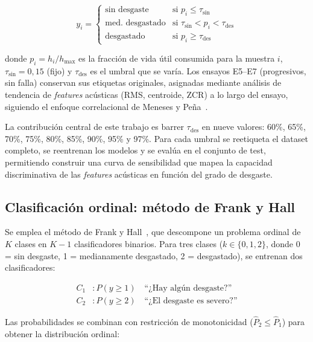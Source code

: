 \documentclass[10pt,twocolumn]{article}
\begin{document}
\begin{equation}
y_i = \begin{cases}
  \text{sin desgaste}        & \text{si } p_i \leq \tau_{\text{sin}} \\
  \text{med.\ desgastado}    & \text{si } \tau_{\text{sin}} < p_i < \tau_{\text{des}} \\
  \text{desgastado}           & \text{si } p_i \geq \tau_{\text{des}}
\end{cases}
\label{eq:etiquetado}
\end{equation}

\noindent donde $p_i = h_i / h_{\max}$ es la fracción de vida útil consumida
para la muestra $i$, $\tau_{\text{sin}} = 0{,}15$ (fijo) y
$\tau_{\text{des}}$ es el umbral que se varía. Los ensayos E5--E7
(progresivos, sin falla) conservan sus etiquetas originales, asignadas
mediante análisis de tendencia de \textit{features} acústicas (RMS,
centroide, ZCR) a lo largo del ensayo, siguiendo el enfoque correlacional
de Meneses y Peña~\cite{meneses2020}.

La contribución central de este trabajo es barrer $\tau_{\text{des}}$ en
nueve valores: 60\%, 65\%, 70\%, 75\%, 80\%, 85\%, 90\%,
95\% y 97\%. Para cada umbral se reetiqueta el dataset completo, se
reentrenan los modelos y se evalúa en el conjunto de test, permitiendo
construir una curva de sensibilidad que mapea la capacidad discriminativa
de las \textit{features} acústicas en función del grado de desgaste.

\subsection{Clasificación ordinal: método de Frank y Hall}

Se emplea el método de Frank y Hall~\cite{frank2001}, que descompone un
problema ordinal de $K$ clases en $K-1$ clasificadores binarios. Para
tres clases ($k \in \{0, 1, 2\}$, donde 0 = sin desgaste, 1 = medianamente
desgastado, 2 = desgastado), se entrenan dos clasificadores:

\begin{align}
C_1&: P(y \geq 1) \quad \text{``¿Hay algún desgaste?''} \\
C_2&: P(y \geq 2) \quad \text{``¿El desgaste es severo?''}
\end{align}

Las probabilidades se combinan con restricción de monotonicidad
($\hat{P}_2 \leq \hat{P}_1$) para obtener la distribución ordinal:
\end{document}

